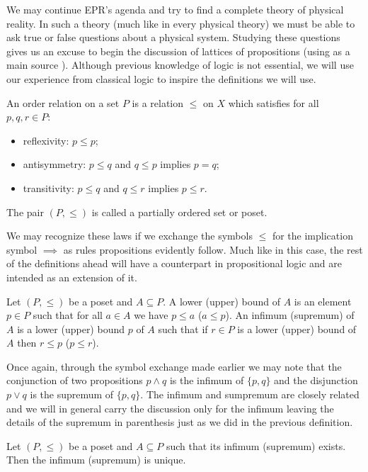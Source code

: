 We may continue EPR's agenda and try to find a complete theory of physical reality. In such a theory (much like in every physical theory) we must be able to ask true or false questions about a physical system. Studying these questions gives us an excuse to begin the discussion of lattices of propositions (using as a main source \cite{Wilce2012}). Although previous knowledge of logic is not essential, we will use our experience from classical logic to inspire the definitions we will use.

\begin{definition}
An order relation on a set $P$ is a relation $\leq$ on $X$ which satisfies for all $p,q,r\in P$:
\begin{itemize}
\item reflexivity: $p\leq p$;
\item antisymmetry: $p\leq q$ and $q\leq p$ implies $p=q$;
\item transitivity: $p\leq q$ and $q\leq r$ implies $p\leq r$.
\end{itemize}
The pair $(P,\leq)$ is called a partially ordered set or poset.
\end{definition}

We may recognize these laws if we exchange the symbols $\leq$ for the implication symbol $\implies$ as rules propositions evidently follow. Much like in this case, the rest of the definitions ahead will have a counterpart in propositional logic and are intended as an extension of it.   

\begin{definition}
Let $(P,\leq)$ be a poset and $A\subseteq P$. A lower (upper) bound of $A$ is an element $p\in P$ such that for all $a \in A$ we have $p\leq a$ ($a\leq p$). An infimum (supremum) of $A$ is a lower (upper) bound $p$ of $A$ such that if $r\in P$ is a lower (upper) bound of $A$ then $r\leq p$ ($p\leq r$).     
\end{definition}

Once again, through the symbol exchange made earlier we may note that the conjunction of two propositions $p\wedge q$ is the infimum of $\{p,q\}$ and the disjunction $p\vee q$ is the supremum of $\{p,q\}$. The infimum and sumpremum are closely related and we will in general carry the discussion only for the infimum leaving the details of the supremum in parenthesis just as we did in the previous definition. 

\begin{theorem}
Let $(P,\leq)$ be a poset and $A\subseteq P$ such that its infimum (supremum) exists. Then the infimum (supremum) is unique. 
\end{theorem}

